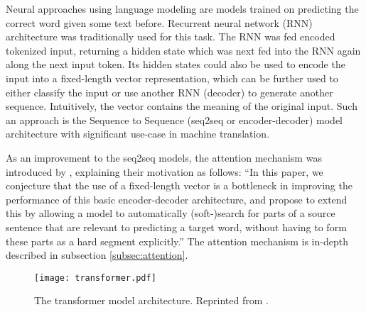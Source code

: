 Neural approaches using language modeling are models trained on predicting the correct word given some text before.  %
Recurrent neural network (RNN) architecture was traditionally used for this task.
The RNN was fed encoded tokenized input, returning a hidden state which was next fed into the RNN again along the next input token.
Its hidden states could also be used to encode the input into a fixed-length vector representation, which can be further used to either classify the input or use another RNN (decoder) to generate another sequence.
Intuitively, the vector contains the meaning of the original input. 
Such an approach is the Sequence to Sequence (seq2seq or encoder-decoder) model architecture \citep{seq2seq} with significant use-case in machine translation.

As an improvement to the seq2seq models, the attention mechanism was introduced by \citet{first-attention}, explaining their motivation as follows: ``In this paper, we conjecture that the use of a fixed-length vector is a bottleneck in improving the performance of this basic encoder-decoder architecture, and propose to extend this by allowing a model to automatically (soft-)search for parts of a source sentence that are relevant to predicting a target word, without having to form these parts as a hard segment explicitly.'' The attention mechanism is in-depth described in subsection \ref{subsec:attention}.

\begin{figure}[b!]
        \centering
        \texttt{[image: transformer.pdf]}
        \caption{The transformer model architecture. Reprinted from \citep{attention-is-all-you-need}.}
        \label{fig:transformer}
\end{figure}

